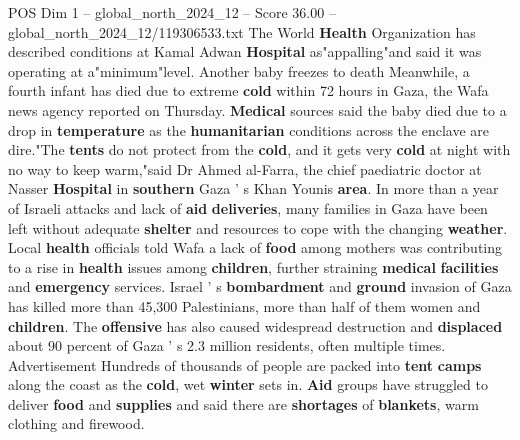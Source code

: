\begin{textsample}{POS Dim 1 – global\_north\_2024\_12 – Score 36.00 – global\_north\_2024\_12/119306533.txt}
The World \textbf{Health} Organization has described conditions at Kamal Adwan \textbf{Hospital} as"appalling"and said it was operating at a"minimum"level.
Another baby freezes to death Meanwhile, a fourth infant has died due to extreme \textbf{cold} within 72 hours in Gaza, the Wafa news agency reported on Thursday. \textbf{Medical} sources said the baby died due to a drop in \textbf{temperature} as the \textbf{humanitarian} conditions across the enclave are dire."The \textbf{tents} do not protect from the \textbf{cold}, and it gets very \textbf{cold} at night with no way to keep warm,"said Dr Ahmed al-Farra, the chief paediatric doctor at Nasser \textbf{Hospital} in \textbf{southern} Gaza ' s Khan Younis \textbf{area}.
In more than a year of Israeli attacks and lack of \textbf{aid} \textbf{deliveries}, many families in Gaza have been left without adequate \textbf{shelter} and resources to cope with the changing \textbf{weather}.
Local \textbf{health} officials told Wafa a lack of \textbf{food} among mothers was contributing to a rise in \textbf{health} issues among \textbf{children}, further straining \textbf{medical} \textbf{facilities} and \textbf{emergency} services.
Israel ' s \textbf{bombardment} and \textbf{ground} invasion of Gaza has killed more than 45,300 Palestinians, more than half of them women and \textbf{children}.
The \textbf{offensive} has also caused widespread destruction and \textbf{displaced} about 90 percent of Gaza ' s 2.3 million residents, often multiple times.
Advertisement Hundreds of thousands of people are packed into \textbf{tent} \textbf{camps} along the coast as the \textbf{cold}, wet \textbf{winter} sets in. \textbf{Aid} groups have struggled to deliver \textbf{food} and \textbf{supplies} and said there are \textbf{shortages} of \textbf{blankets}, warm clothing and firewood.

\end{textsample}

